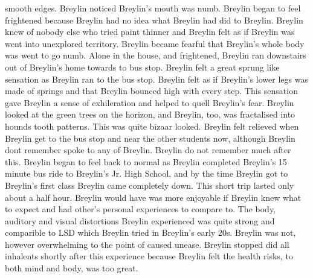 \documentclass[12pt]{book}
\begin{document}
smooth edges. Breylin noticed Breylin's mouth was numb. Breylin began to feel frightened because Breylin had no idea what Breylin had did to Breylin. Breylin knew of nobody else who tried paint thinner and Breylin felt as if Breylin was went into unexplored territory. Breylin became fearful that Breylin's whole body was went to go numb. Alone in the house, and frightened, Breylin ran downstairs out of Breylin's home towards to bus stop. Breylin felt a great sprung like sensation as Breylin ran to the bus stop. Breylin felt as if Breylin's lower legs was made of springs and that Breylin bounced high with every step. This sensation gave Breylin a sense of exhileration and helped to quell Breylin's fear. Breylin looked at the green trees on the horizon, and Breylin, too, was fractalised into hounds tooth patterns. This was quite bizaar looked. Breylin felt relieved when Breylin get to the bus stop and near the other students now, although Breylin dont remember spoke to any of Breylin. Breylin do not remember much after this. Breylin began to feel back to normal as Breylin completed Breylin's 15 minute bus ride to Breylin's Jr. High School, and by the time Breylin got to Breylin's first class Breylin came completely down. This short trip lasted only about a half hour. Breylin would have was more enjoyable if Breylin knew what to expect and had other's personal experiences to compare to. The body, auditory and visual distortions Breylin experienced was quite strong and comparible to LSD which Breylin tried in Breylin's early 20s. Breylin was not, however overwhelming to the point of caused unease. Breylin stopped did all inhalents shortly after this experience because Breylin felt the health risks, to both mind and body, was too great.
\end{document}
